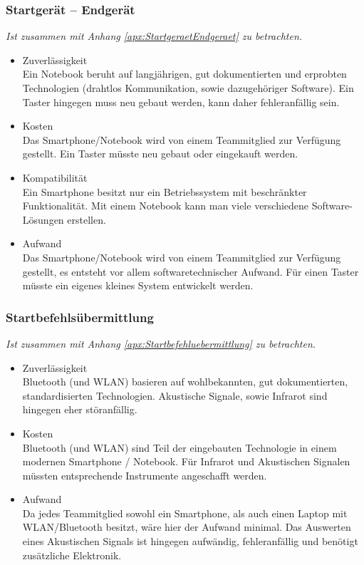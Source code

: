 		\subsubsection{Startgerät – Endgerät}
			\textit{Ist zusammen mit Anhang \ref{apx:StartgeraetEndgeraet} zu betrachten.}
			\begin{itemize}
				\item Zuverlässigkeit\\
				Ein Notebook beruht auf langjährigen, gut dokumentierten und erprobten Technologien (drahtlos Kommunikation, sowie dazugehöriger Software). Ein Taster hingegen muss neu gebaut werden, kann daher fehleranfällig sein.
				\item Kosten\\
				Das Smartphone/Notebook wird von einem Teammitglied zur Verfügung gestellt. Ein Taster müsste neu gebaut oder eingekauft werden.
				\item Kompatibilität\\
				Ein Smartphone besitzt nur ein Betriebssystem mit beschränkter Funktionalität. Mit einem Notebook kann man viele verschiedene Software-Lösungen erstellen.
				\item Aufwand\\
				Das Smartphone/Notebook wird von einem Teammitglied zur Verfügung gestellt, es entsteht vor allem softwaretechnischer Aufwand. Für einen Taster müsste ein eigenes kleines System entwickelt werden.
			\end{itemize}
			
		\subsubsection{Startbefehlsübermittlung}
			\textit{Ist zusammen mit Anhang \ref{apx:Startbefehluebermittlung} zu betrachten.}
			\begin{itemize}
				\item Zuverlässigkeit\\
				Bluetooth (und WLAN) basieren auf wohlbekannten, gut dokumentierten, standardisierten Technologien. Akustische Signale, sowie Infrarot sind hingegen eher störanfällig.
				\item Kosten\\
				Bluetooth (und WLAN) sind Teil der eingebauten Technologie in einem modernen Smartphone / Notebook. Für Infrarot und Akustischen Signalen müssten entsprechende Instrumente angeschafft werden.
				\item Aufwand\\
				Da jedes Teammitglied sowohl ein Smartphone, als auch einen Laptop mit WLAN/Bluetooth besitzt, wäre hier der Aufwand minimal. Das Auswerten eines Akustischen Signals ist hingegen aufwändig, fehleranfällig und benötigt zusätzliche Elektronik.
			\end{itemize}	
			
